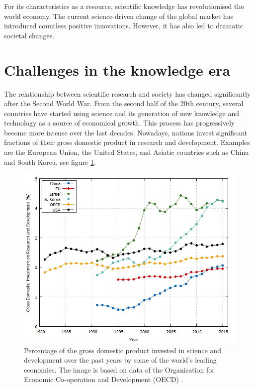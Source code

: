 For its characteristics as a resource, scientific knowledge has revolutionised the world economy. The current science-driven change of the global market has introduced countless positive innovations. However, it has also led to dramatic societal changes.   

\section{Challenges in the knowledge era} \label{Challenges_in_the_knowledge_era}
The relationship between scientific research and society has changed significantly after the Second World War. From the second half of the 20th century, several countries have started using science and its generation of new knowledge and technology as a source of economical growth. This process has progressively become more intense over the last decades. Nowadays, nations invest significant fractions of their gross domestic product in research and development. Examples are the European Union, the United States, and Asiatic countries such as China and South Korea, see figure \ref{GD_investment}.    

\begin{figure}[!t] 
 \begin{center}
 \includegraphics[scale=0.4]{Images/GD_investment.png}
 \caption{Percentage of the gross domestic product invested in science and development over the past years by some of the world's leading economies. The image is based on data of the Organisation for Economic Co-operation and Development (OECD) \cite{OECD}.}
 \label{GD_investment}
 \end{center}
\end{figure}

